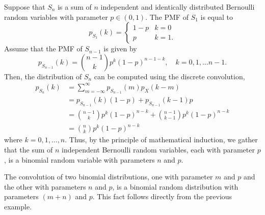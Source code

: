 \begin{example}
Suppose that $S_n$ is a sum of $n$ independent and identically distributed Bernoulli random variables with parameter $p \in (0,1)$.
The PMF of $S_1$ is equal to
\begin{equation*}
p_{S_1} (k) = \begin{cases} 1 - p & k = 0 \\
p & k = 1 .  \end{cases}
\end{equation*}
Assume that the PMF of $S_{n-1}$ is given by
\begin{equation*}
p_{S_{n-1}} (k)
= \binom{n-1}{k} p^k (1-p)^{n-1-k} ,
\quad k = 0, 1, \ldots n-1 .
\end{equation*}
Then, the distribution of $S_n$ can be computed using the discrete convolution,
\begin{equation*}
\begin{split}
p_{S_n} (k) &= \sum_{m = - \infty}^{\infty} p_{S_{n-1}}(m) p_X(k-m) \\
&= p_{S_{n-1}}(k) (1-p) + p_{S_{n-1}}(k-1) p \\
&= \binom{n-1}{k} p^{k} (1-p)^{n-k} + \binom{n-1}{k-1} p^{k} (1-p)^{n-k} \\
&= \binom{n}{k} p^{k} (1-p)^{n-k}
\end{split}
\end{equation*}
where $k = 0, 1, \ldots, n$.
Thus, by the principle of mathematical induction, we gather that the sum of $n$ independent Bernoulli random variables, each with parameter $p$, is a binomial random variable with parameters $n$ and $p$.
\end{example}

The convolution of two binomial distributions, one with parameter $m$ and $p$ and the other with parameters $n$ and $p$, is a binomial random distribution with parameters $(m+n)$ and $p$.
This fact follows directly from the previous example.

